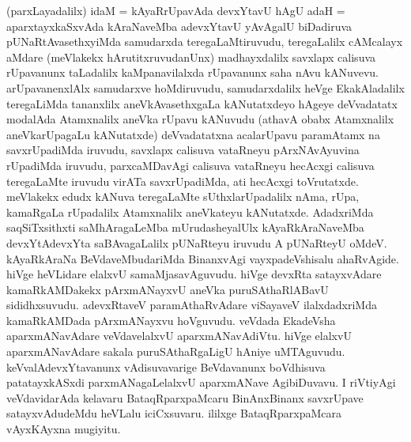 \begin{artha}
(parxLayadalilx) idaM = kAyaRrUpavAda devxYtavU hAgU adaH = aparxtayxkaSxvAda kAraNaveMba adevxYtavU yAvAgalU biDadiruva pUNaRtAvasethxyiMda samudarxda teregaLaMtiruvudu, teregaLalilx cAMcalayx aMdare (meVlakekx hArutitxruvudanUnx) madhayxdalilx savxlapx calisuva rUpavanunx taLadalilx kaMpanavilalxda rUpavanunx saha nAvu kANuvevu. arUpavanenxlAlx samudarxve hoMdiruvudu, samudarxdalilx heVge EkakAladalilx teregaLiMda tananxlilx  aneVkAvasethxgaLa kANutatxdeyo hAgeye deVvadatatx modalAda Atamxnalilx aneVka rUpavu kANuvudu (athavA obabx Atamxnalilx aneVkarUpagaLu kANutatxde) deVvadatatxna acalarUpavu paramAtamx na savxrUpadiMda iruvudu, savxlapx calisuva vataRneyu pArxNAvAyuvina rUpadiMda iruvudu, parxcaMDavAgi calisuva vataRneyu hecAcxgi calisuva teregaLaMte iruvudu virATa savxrUpadiMda, ati hecAcxgi toVrutatxde. meVlakekx edudx kANuva teregaLaMte sUthxlarUpadalilx nAma, rUpa, kamaRgaLa rUpadalilx Atamxnalilx aneVkateyu kANutatxde. AdadxriMda saqSiTxsithxti saMhAragaLeMba mUrudasheyalUlx kAyaRkAraNaveMba devxYtAdevxYta saBAvagaLalilx pUNaRteyu iruvudu A pUNaRteyU oMdeV. kAyaRkAraNa BeVdaveMbudariMda BinanxvAgi vayxpadeVshisalu ahaRvAgide. hiVge heVLidare elalxvU samaMjasavAguvudu. hiVge devxRta satayxvAdare kamaRkAMDakekx pArxmANayxvU aneVka puruSAthaRlABavU sididhxsuvudu. adevxRtaveV paramAthaRvAdare viSayaveV ilalxdadxriMda kamaRkAMDada pArxmANayxvu hoVguvudu. veVdada EkadeVsha aparxmANavAdare veVdavelalxvU aparxmANavAdiVtu. hiVge elalxvU aparxmANavAdare sakala puruSAthaRgaLigU hAniye uMTAguvudu. keVvalAdevxYtavanunx vAdisuvavarige BeVdavanunx boVdhisuva patatayxkASxdi parxmANagaLelalxvU aparxmANave AgibiDuvavu. I riVtiyAgi veVdavidarAda kelavaru BataqRparxpaMcaru BinAnxBinanx savxrUpave satayxvAdudeMdu heVLalu iciCxsuvaru. ililxge BataqRparxpaMcara vAyxKAyxna mugiyitu. 
\end{artha}


